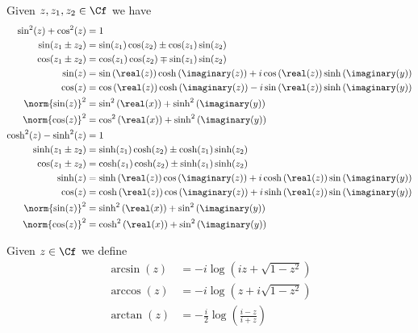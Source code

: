 \documentclass[../mmf.tex]{subfiles}
\begin{document}
\begin{thm}
	Given $z,z_1,z_2\in\Cf$ we have
	\begin{equation}
		\begin{aligned}
			\sin^2(z)+\cos^2(z)&=1\\
			\sin(z_1\pm z_2)&=\sin(z_1)\cos(z_2)\pm\cos(z_1)\sin(z_2)\\
			\cos(z_1\pm z_2)&=\cos(z_1)\cos(z_2)\mp\sin(z_1)\sin(z_2)\\
			\sin(z)&=\sin\left( \real(z) \right)\cosh\left( \imaginary(z) \right)+i\cos\left( \real(z) \right)\sinh\left( \imaginary(y) \right)\\
			\cos(z)&=\cos\left( \real(z) \right)\cosh\left( \imaginary(z) \right)-i\sin\left( \real(z) \right)\sinh\left( \imaginary(y) \right)\\
			\norm{\sin(z)}^2&=\sin^2\left( \real(x) \right)+\sinh^2\left( \imaginary(y) \right)\\
			\norm{\cos(z)}^2&=\cos^2\left( \real(x) \right)+\sinh^2\left( \imaginary(y) \right)\\
			\cosh^2(z)-\sinh^2(z)&=1\\
			\sinh(z_1\pm z_2)&=\sinh(z_1)\cosh(z_2)\pm\cosh(z_1)\sinh(z_2)\\
			\cos(z_1\pm z_2)&=\cosh(z_1)\cosh(z_2)\pm\sinh(z_1)\sinh(z_2)\\
			\sinh(z)&=\sinh\left( \real(z) \right)\cos\left( \imaginary(z) \right)+i\cosh\left( \real(z) \right)\sin\left( \imaginary(y) \right)\\
			\cos(z)&=\cosh\left( \real(z) \right)\cos\left( \imaginary(z) \right)+i\sinh\left( \real(z) \right)\sin\left( \imaginary(y) \right)\\
			\norm{\sin(z)}^2&=\sinh^2\left( \real(x) \right)+\sin^2\left( \imaginary(y) \right)\\
			\norm{\cos(z)}^2&=\cosh^2\left( \real(x) \right)+\sin^2\left( \imaginary(y) \right)\\
		\end{aligned}
		\label{eq:trigidentities}
	\end{equation}
\end{thm}
\begin{dfn}
	Given $z\in\Cf$ we define
	\begin{equation}
		\begin{aligned}
			\arcsin(z)&=-i\log\left( iz+\sqrt{1-z^2} \right)\\
			\arccos(z)&=-i\log\left( z+i\sqrt{1-z^2} \right)\\
			\arctan(z)&=-\frac{i}{2}\log\left( \frac{i-z}{i+z} \right)
		\end{aligned}
		\label{eq:inversetrig}
	\end{equation}
\end{dfn}
\end{document}
